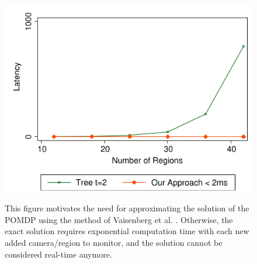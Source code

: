 \documentclass[12pt,twoside]{article}
\theoremstyle{plain}
\theoremstyle{definition}
\theoremstyle{remark}
\begin{document}
\begin{figure}[H]
  \caption{
  This figure motivates the need for approximating the solution of the POMDP using the method of Vaisenberg et al. \cite{vaisenberg2014scheduling}. Otherwise, the exact solution requires exponential computation time with each new added camera/region to monitor, and the solution cannot be considered real-time anymore.}
  \centering
    \includegraphics[scale=0.6]{vaisenbergevaluation2.png}
  \label{vaisenbergevaluation2}
\end{figure}
\end{document}
